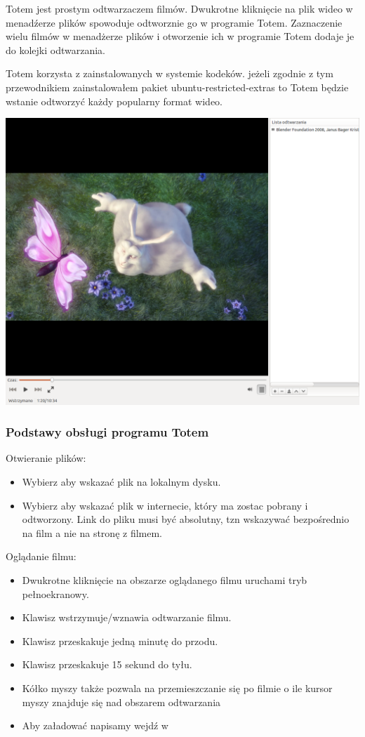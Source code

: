 Totem jest prostym odtwarzaczem filmów. Dwukrotne kliknięcie na plik wideo w menadźerze plików spowoduje odtworznie go w programie Totem. Zaznaczenie wielu filmów w menadżerze plików i otworzenie ich w programie Totem dodaje je do kolejki odtwarzania. 

Totem korzysta z zainstalowanych w systemie kodeków. jeżeli zgodnie z tym przewodnikiem zainstalowałem pakiet \textcolor{ubuntu_orange}{ubuntu-restricted-extras} to Totem będzie wstanie odtworzyć każdy popularny format wideo.
\begin{center}
	\includegraphics[width=\linewidth]{images/programy_totem1.png}
\end{center}

\subsubsection{Podstawy obsługi programu Totem}
Otwieranie plików:
\begin{itemize}
\item Wybierz  aby wskazać plik na lokalnym dysku.
\item Wybierz  aby wskazać plik w internecie, który ma zostac pobrany i odtworzony. Link do pliku musi być absolutny, tzn wskazywać bezpośrednio na film a nie na stronę z filmem.
\end{itemize}
Oglądanie filmu:
\begin{itemize}
\item Dwukrotne kliknięcie na obszarze oglądanego filmu uruchami tryb pełnoekranowy.
\item Klawisz \keys{\Space} wstrzymuje/wznawia odtwarzanie filmu.
\item Klawisz \keys{\arrowkeyright} przeskakuje jedną minutę do przodu.
\item Klawisz \keys{\arrowkeyleft} przeskakuje 15 sekund do tyłu.
\item Kółko myszy także pozwala na przemieszczanie się po filmie o ile kursor myszy znajduje się nad obszarem odtwarzania
\item Aby załadować napisamy wejdź w 
\end{itemize}

